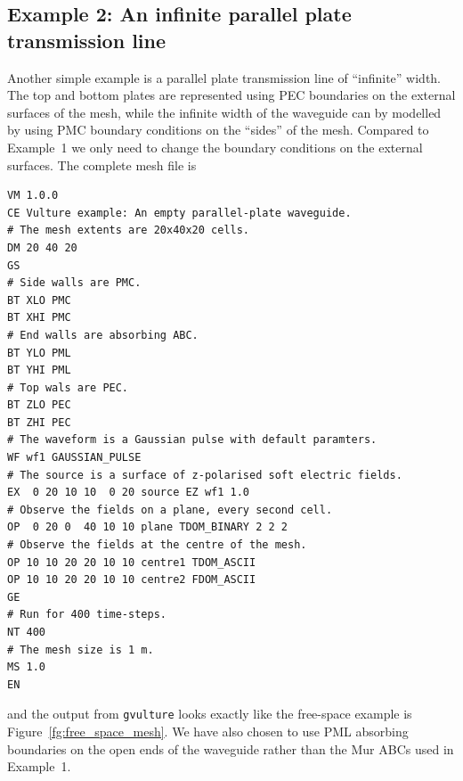 \documentclass[onecolumn,a4paper]{article}
\numberwithin{equation}{section}
\begin{document}
\subsection{Example 2: An infinite parallel plate transmission line}

Another simple example is a parallel plate transmission line 
of ``infinite'' width. The top and bottom plates are represented using
PEC boundaries on the external surfaces of the mesh, while the infinite width of the
waveguide can by modelled by using PMC boundary conditions on 
the ``sides'' of the mesh. Compared to Example~1 we only need to change the 
boundary conditions on the external surfaces. The complete mesh file is 
\begin{verbatim}
VM 1.0.0
CE Vulture example: An empty parallel-plate waveguide.
# The mesh extents are 20x40x20 cells.
DM 20 40 20
GS
# Side walls are PMC.
BT XLO PMC
BT XHI PMC
# End walls are absorbing ABC.
BT YLO PML
BT YHI PML
# Top wals are PEC.
BT ZLO PEC
BT ZHI PEC
# The waveform is a Gaussian pulse with default paramters.
WF wf1 GAUSSIAN_PULSE
# The source is a surface of z-polarised soft electric fields.
EX  0 20 10 10  0 20 source EZ wf1 1.0
# Observe the fields on a plane, every second cell.
OP  0 20 0  40 10 10 plane TDOM_BINARY 2 2 2
# Observe the fields at the centre of the mesh.
OP 10 10 20 20 10 10 centre1 TDOM_ASCII
OP 10 10 20 20 10 10 centre2 FDOM_ASCII
GE
# Run for 400 time-steps.
NT 400 
# The mesh size is 1 m.
MS 1.0
EN
\end{verbatim}
and the output from \texttt{gvulture} looks exactly like the free-space example is 
Figure~\ref{fg:free_space_mesh}. We have also chosen to use PML absorbing 
boundaries on the open ends of the waveguide rather than the Mur ABCs used in Example~1.
\end{document}
